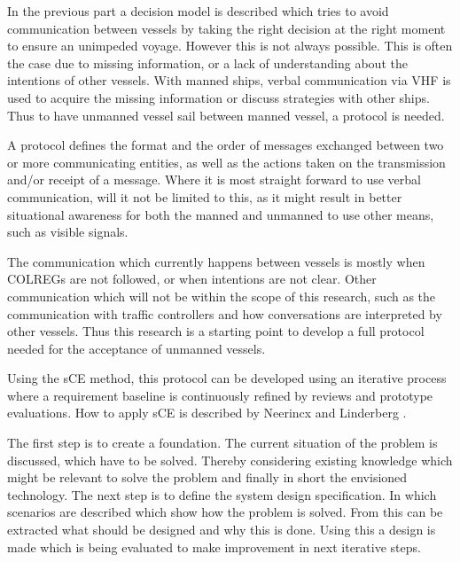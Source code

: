 In the previous part a decision model is described which tries to avoid communication between vessels by taking the right decision at the right moment to ensure an unimpeded voyage. However this is not always possible. This is often the case due to missing information, or a lack of understanding about the intentions of other vessels. With manned ships, verbal communication via \ac{VHF} is used to acquire the missing information or discuss strategies with other ships. Thus to have unmanned vessel sail between manned vessel, a protocol is needed.


A protocol defines the format and the order of messages exchanged between two or more communicating entities, as well as the actions taken on the transmission and/or receipt of a message. Where it is most straight forward to use verbal communication, will it not be limited to this, as it might result in better situational awareness for both the manned and unmanned to use other means, such as visible signals.

The communication which currently happens between vessels is mostly when \ac{COLREGs} are not followed, or when intentions are not clear. Other communication which will not be within the scope of this research, such as the communication with traffic controllers and how conversations are interpreted by other vessels.
Thus this research is a starting point to develop a full protocol needed for the acceptance of unmanned vessels.

Using the \acf{sCE} method, this protocol can be developed using an iterative process where a  requirement baseline is continuously refined by reviews and prototype evaluations. How to apply \ac{sCE} is described by Neerincx and Linderberg \cite{Neerincx2012}.

The first step is to create a foundation. The current situation of the problem is discussed, which have to be solved. Thereby considering existing knowledge which might be relevant to solve the problem and finally in short the envisioned technology. The next step is to define the system design specification. In which scenarios are described which show how the problem is solved. From this can be extracted what should be designed and why this is done. Using this a design is made which is being evaluated to make improvement in next iterative steps.